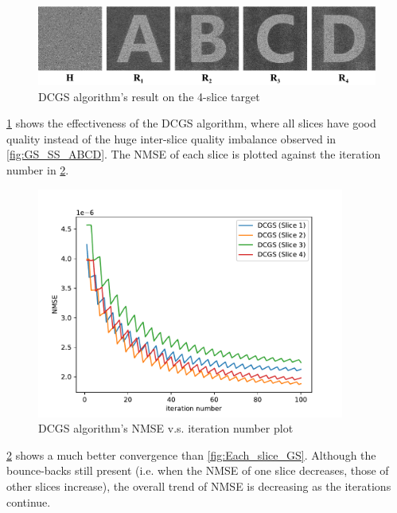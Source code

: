 \begin{figure}[H]
  \centering
  \includegraphics[width=1.0\textwidth]{ABCD/DCGS_ABCD.pdf}
  \caption{DCGS algorithm's result on the 4-slice target}
  \label{fig:DCGS_ABCD}
\end{figure}

\cref{fig:DCGS_ABCD} shows the effectiveness of the DCGS algorithm, where all slices have good quality instead of the huge inter-slice quality imbalance observed in \cref{fig:GS_SS_ABCD}. The NMSE of each slice is plotted against the iteration number in \cref{fig:Each_slice_DCGS}.

\begin{figure}[H]
  \centering
  \includegraphics[width=0.9\textwidth]{ABCD/Each_slice_DCGS.pdf}
  \caption{DCGS algorithm's NMSE v.s. iteration number plot}
  \label{fig:Each_slice_DCGS}
\end{figure}

\cref{fig:Each_slice_DCGS} shows a much better convergence than \cref{fig:Each_slice_GS}. Although the bounce-backs still present (i.e. when the NMSE of one slice decreases, those of other slices increase), the overall trend of NMSE is decreasing as the iterations continue.
